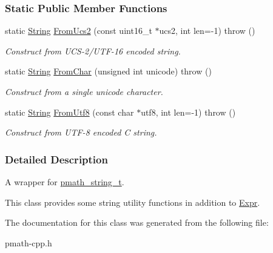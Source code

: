\subsubsection*{Static Public Member Functions}
\begin{CompactItemize}
\item 
\hypertarget{classpmath_1_1_string_8010a9b5667091e2617e4471cb46cfab}{
static \hyperlink{classpmath_1_1_string}{String} \hyperlink{classpmath_1_1_string_8010a9b5667091e2617e4471cb46cfab}{FromUcs2} (const uint16\_\-t $\ast$ucs2, int len=-1)  throw ()}
\label{classpmath_1_1_string_8010a9b5667091e2617e4471cb46cfab}

\begin{CompactList}\small\item\em Construct from UCS-2/UTF-16 encoded string. \item\end{CompactList}\item 
\hypertarget{classpmath_1_1_string_7f0cdb2834581c15c490e66b766334f5}{
static \hyperlink{classpmath_1_1_string}{String} \hyperlink{classpmath_1_1_string_7f0cdb2834581c15c490e66b766334f5}{FromChar} (unsigned int unicode)  throw ()}
\label{classpmath_1_1_string_7f0cdb2834581c15c490e66b766334f5}

\begin{CompactList}\small\item\em Construct from a single unicode character. \item\end{CompactList}\item 
\hypertarget{classpmath_1_1_string_aec750641607be2190b98a7c5caeaba0}{
static \hyperlink{classpmath_1_1_string}{String} \hyperlink{classpmath_1_1_string_aec750641607be2190b98a7c5caeaba0}{FromUtf8} (const char $\ast$utf8, int len=-1)  throw ()}
\label{classpmath_1_1_string_aec750641607be2190b98a7c5caeaba0}

\begin{CompactList}\small\item\em Construct from UTF-8 encoded C string. \item\end{CompactList}\end{CompactItemize}


\subsubsection{Detailed Description}
A wrapper for \hyperlink{classpmath__string__t}{pmath\_\-string\_\-t}.

This class provides some string utility functions in addition to \hyperlink{classpmath_1_1_expr}{Expr}. 

The documentation for this class was generated from the following file:\begin{CompactItemize}
\item 
pmath-cpp.h\end{CompactItemize}

